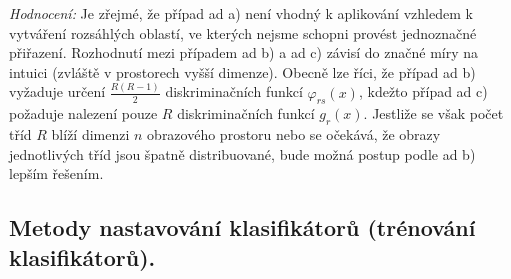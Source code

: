 \textit{Hodnocení:} Je zřejmé, že případ ad a) není vhodný k aplikování vzhledem k vytváření rozsáhlých oblastí, ve kterých nejsme schopni provést jednoznačné přiřazení. Rozhodnutí mezi případem ad b) a ad c) závisí do značné míry na intuici (zvláště v prostorech vyšší dimenze). Obecně lze říci, že případ ad b) vyžaduje určení $ \frac{R(R-1)}{2} $ diskriminačních funkcí $ \varphi_{rs}(x) $, kdežto případ ad c) požaduje nalezení pouze $ R $ diskriminačních funkcí $ g_r(x) $. Jestliže se však počet tříd $ R $ blíží dimenzi $ n $ obrazového prostoru nebo se očekává, že obrazy jednotlivých tříd jsou špatně distribuované, bude možná postup podle ad b) lepším řešením.

\subsection{Metody nastavování klasifikátorů (trénování klasifikátorů).}
